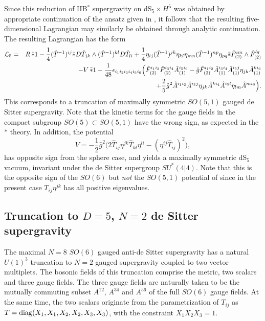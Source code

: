 \documentclass[a4paper,12pt]{article}
\begin{document}
Since this reduction of IIB$^*$ supergravity on dS$_5\times H^5$ was
obtained by appropriate continuation of the ansatz given in
\cite{Cvetic2}, it follows that the resulting five-dimensional
Lagrangian may similarly be obtained through analytic continuation.  The
resulting Lagrangian has the form \cite{Cvetic2}
%
\begin{eqnarray}
{\cal L}_5&=&R\,\bar{\ast}1-\frac{1}{4}(\hat T^{-1})^{ij}\bar{\ast}D\hat
T_{jk}\wedge (\hat T^{-1})^{kl}D\hat T_{li}
+\frac{1}{4}\eta_{ij}(\hat T^{-1})^{jk}\eta_{kl}
\eta_{mn}(\hat T^{-1})^{np}\eta_{pq}
\bar{\ast}\hat F^{im}_{(2)}\wedge\hat F^{lq}_{(2)}\nonumber\\
&&\qquad-V\,\bar{\ast}1
-\frac{1}{48}\epsilon_{i_1i_2i_3i_4i_5i_6}\Bigl(\hat F^{i_1i_2}_{(2)}
\hat F^{i_3i_4}_{(2)}\hat A^{i_5i_6}_{(1)}-\hat g\hat F^{i_1i_2}_{(2)}
\hat A^{i_3i_4}_{(1)}\hat A^{i_5j}_{(1)}\eta_{jk}\hat A^{ki_6}_{(1)} 
\nonumber\\
&&\qquad
+\frac{2}{5}\hat g^2\hat A^{i_1i_2}\hat A^{i_3j}\eta_{jk}\hat A^{ki_4}
\hat A^{i_5l}\eta_{lm}\hat A^{mi_6}\Bigr).
\label{eq:d5n8lag}
\end{eqnarray}
%
This corresponds to a truncation of maximally symmetric $SO(5,1)$
gauged de Sitter supergravity.  Note that the kinetic terms for the
gauge fields in the compact subgroup $SO(5)\subset SO(5,1)$
have the wrong sign, as expected in the $*$ theory.  In addition,
the potential
%
\begin{equation}
V=-\frac{1}{2}\hat g^2\Bigr(2\hat T_{ij}\eta^{jk}\hat T_{kl}\eta^{li}
-(\eta^{ij}\hat T_{ij})^2\Bigr),
\end{equation}
%
has opposite sign from the sphere case, and yields a maximally symmetric
dS$_5$ vacuum, invariant under the de Sitter supergroup $SU^*(4|4)$.
Note that this is the opposite sign of the $SO(6)$ but {\it not} the
$SO(5,1)$ potential of \cite{Gunaydin:1984qu,Pernici:ju,Gunaydin} since in
the present case $T_{ij}\eta^{jk}$ has all positive eigenvalues.

\subsection{Truncation to $D=5$, $N=2$ de Sitter supergravity}

The maximal $N=8$ $SO(6)$ gauged anti-de Sitter supergravity has a
natural $U(1)^3$ truncation to $N=2$ gauged supergravity coupled to two
vector multiplets.  The bosonic fields of this truncation comprise the
metric, two scalars and three gauge fields.  The three gauge fields are
naturally taken to be the mutually commuting subset $A^{12}$, $A^{34}$ and
$A^{56}$ of the full $SO(6)$ gauge fields.  At the same time, the two
scalars originate from the parametrization of $T_{ij}$ as
$T={\rm diag}(X_1,X_1,X_2,X_2,X_3,X_3)$, with the constraint $X_1X_2X_3=1$.
\end{document}
